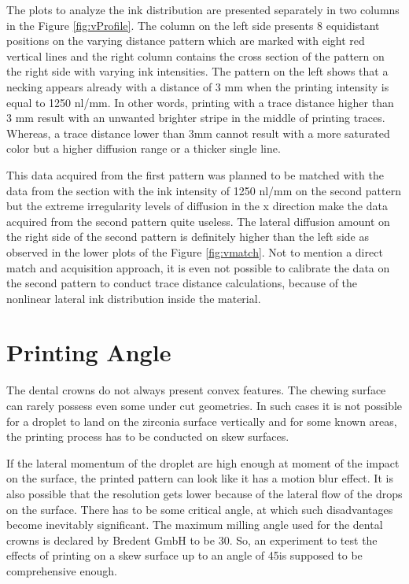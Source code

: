 \bigskip

The plots to analyze the ink distribution are presented separately in two columns in the Figure \ref{fig:vProfile}. The column on the left side presents 8 equidistant positions on the varying distance pattern which are marked with eight red vertical lines and the right column contains the cross section of the pattern on the right side with varying ink intensities. The pattern on the left shows that a necking appears already with a distance of 3 mm when the printing intensity is equal to 1250 nl/mm. In other words, printing with a trace distance higher than 3 mm result with an unwanted brighter stripe in the middle of printing traces. Whereas, a trace distance lower than 3mm cannot result with a more saturated color but a higher diffusion range or a thicker single line. 

This data acquired from the first pattern was planned to be matched with the data from the section with the ink intensity of 1250 nl/mm on the second pattern but the extreme irregularity levels of diffusion in the x direction make the data acquired from the second pattern quite useless. The lateral diffusion amount on the right side of the second pattern is definitely higher than the left side as observed in the lower plots of the Figure \ref{fig:vmatch}. Not to mention a direct match and acquisition approach, it is even not possible to calibrate the data on the second pattern to conduct trace distance calculations, because of the nonlinear lateral ink distribution inside the material.



\section{Printing Angle}
The dental crowns do not always present convex features. The chewing surface can rarely possess even some under cut geometries. In such cases it is not possible for a droplet to land on the zirconia surface vertically and for some known areas, the printing process has to be conducted on skew surfaces. 

If the lateral momentum of the droplet are high enough at moment of the impact on the surface, the printed pattern can look like it has a motion blur effect. It is also possible that the resolution gets lower because of the lateral flow of the drops on the surface. There has to be some critical angle, at which such disadvantages become inevitably  significant. The maximum milling angle used for the dental crowns is declared by Bredent GmbH to be 30\textdegree \space. So, an experiment to test the effects of printing on a skew surface up to an angle of 45\textdegree \space is supposed to be comprehensive enough.


